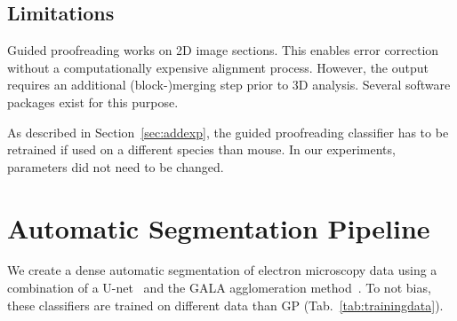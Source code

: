 \subsection{Limitations}
Guided proofreading works on 2D image sections. This enables error correction without a computationally expensive alignment process. However, the output requires an additional (block-)merging step prior to 3D analysis. Several software packages exist for this purpose.

As described in Section~\ref{sec:addexp}, the guided proofreading classifier has to be retrained if used on a different species than mouse. In our experiments, parameters did not need to be changed.

\section{Automatic Segmentation Pipeline}

We create a dense automatic segmentation of electron microscopy data using a combination of a U-net~\cite{RonnebergerFB15} and the GALA agglomeration method~\cite{nunez2014graph}. To not bias, these classifiers are trained on different data than GP (Tab.~\ref{tab:trainingdata}).

